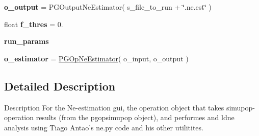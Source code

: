 \begin{DoxyCompactItemize}
\item 
{\bfseries o\+\_\+output} = P\+G\+Output\+Ne\+Estimator( s\+\_\+file\+\_\+to\+\_\+run + \char`\"{}.ne.\+est\char`\"{} )\hypertarget{namespacenegui_1_1pgopneestimator_abc93d890dd7f095954d3220bb9484175}{}\label{namespacenegui_1_1pgopneestimator_abc93d890dd7f095954d3220bb9484175}

\item 
float {\bfseries f\+\_\+thres} = 0.\hypertarget{namespacenegui_1_1pgopneestimator_a10fd09063d78e9c0578f9c077fa636a5}{}\label{namespacenegui_1_1pgopneestimator_a10fd09063d78e9c0578f9c077fa636a5}

\item 
{\bfseries run\+\_\+params}\hypertarget{namespacenegui_1_1pgopneestimator_a5667af4f089ff66e2068be1325179790}{}\label{namespacenegui_1_1pgopneestimator_a5667af4f089ff66e2068be1325179790}

\item 
{\bfseries o\+\_\+estimator} = \hyperlink{classnegui_1_1pgopneestimator_1_1PGOpNeEstimator}{P\+G\+Op\+Ne\+Estimator}( o\+\_\+input, o\+\_\+output )\hypertarget{namespacenegui_1_1pgopneestimator_a1cdcbf37871f21d6d4c80ba06b7104e5}{}\label{namespacenegui_1_1pgopneestimator_a1cdcbf37871f21d6d4c80ba06b7104e5}

\end{DoxyCompactItemize}


\subsection{Detailed Description}
\begin{DoxyVerb}Description
For the Ne-estimation gui, the operation object
that takes simupop-operation results (from the pgopsimupop
object), and performes and ldne analysis using Tiago Antao's
ne.py code and his other utilitites.
\end{DoxyVerb}
 
